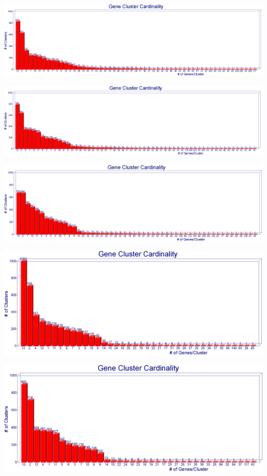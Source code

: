\documentclass[11pt,notitlepage]{article}
\begin{document}
  \includegraphics[width=145mm]{i30_a50_graph.png}
  
  \includegraphics[width=145mm]{i30_a70_graph.png}
  
  \includegraphics[width=145mm]{i30_a90_graph.png}
  
  \includegraphics[width=145mm]{i45_a50_graph.png}
  
  \includegraphics[width=145mm]{i45_a70_graph.png}
  
\end{document}
